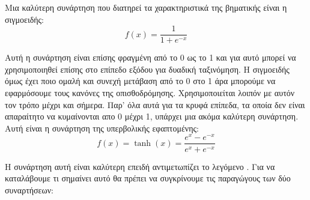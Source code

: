 Μια καλύτερη συνάρτηση που διατηρεί τα χαρακτηριστικά της βηματικής είναι η σιγμοειδής:
$$f(x)=\frac{1}{1+e^{-x}}$$
\begin{figure}[H]
    \centering
    \caption{}
\end{figure}
Αυτή η συνάρτηση είναι επίσης φραγμένη από το 0 ως το 1 και για αυτό μπορεί να χρησιμοποιηθεί επίσης στο επίπεδο εξόδου για δυαδική ταξινόμηση. Η σιγμοειδής όμως έχει ποιο ομαλή και συνεχή μετάβαση από το 0 στο 1 άρα μπορούμε να εφαρμόσουμε
τους κανόνες της οπισθοδρόμησης. Χρησιμοποιείται λοιπόν με αυτόν τον τρόπο μέχρι και σήμερα. Παρ' όλα αυτά για τα κρυφά επίπεδα, τα οποία δεν είναι απαραίτητο να κυμαίνονται απο 0 μέχρι 1, υπάρχει μια ακόμα καλύτερη συνάρτηση. Αυτή είναι η
συνάρτηση της υπερβολικής εφαπτομένης:
$$f(x)=\tanh (x)=\frac{e^x-e^{-x}}{e^x+e^{-x}}$$
\begin{figure}[H]
    \centering
    \caption{}
\end{figure}
Η συνάρτηση αυτή είναι καλύτερη επειδή αντιμετωπίζει το λεγόμενο . Για να καταλάβουμε τι σημαίνει αυτό θα πρέπει να συγκρίνουμε τις παραγώγους των δύο συναρτήσεων:
